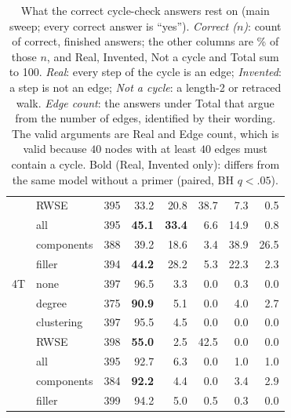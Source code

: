 \begin{table}[!t]
\begin{tabular}{@{}llrrrrrr@{}}
 & RWSE & 395 & 33.2 & 20.8 & 38.7 & 7.3 & 0.5\\ %
 & all & 395 & \textbf{45.1} & \textbf{33.4} & 6.6 & 14.9 & 0.8\\ %
 & components & 388 & 39.2 & 18.6 & 3.4 & 38.9 & 26.5\\ %
 & filler & 394 & \textbf{44.2} & 28.2 & 5.3 & 22.3 & 2.3\\ %
\addlinespace[2pt]
4T & none & 397 & 96.5 & 3.3 & 0.0 & 0.3 & 0.0\\ %
 & degree & 375 & \textbf{90.9} & 5.1 & 0.0 & 4.0 & 2.7\\ %
 & clustering & 397 & 95.5 & 4.5 & 0.0 & 0.0 & 0.0\\ %
 & RWSE & 398 & \textbf{55.0} & 2.5 & 42.5 & 0.0 & 0.0\\ %
 & all & 395 & 92.7 & 6.3 & 0.0 & 1.0 & 1.0\\ %
 & components & 384 & \textbf{92.2} & 4.4 & 0.0 & 3.4 & 2.9\\ %
 & filler & 399 & 94.2 & 5.0 & 0.5 & 0.3 & 0.0\\ %
\bottomrule
\end{tabular}
\caption{What the correct cycle-check answers rest on (main sweep; every correct answer is ``yes''). \emph{Correct ($n$)}: count of correct, finished answers; the other columns are \% of those $n$, and Real, Invented, Not a cycle and Total sum to 100. \emph{Real}: every step of the cycle is an edge; \emph{Invented}: a step is not an edge; \emph{Not a cycle}: a length-2 or retraced walk. \emph{Edge count}: the answers under Total that argue from the number of edges, identified by their wording. The valid arguments are Real and Edge count, which is valid because $40$ nodes with at least $40$ edges must contain a cycle. Bold (Real, Invented only): differs from the same model without a primer (paired, BH $q<.05$).} %
\label{tab:cycles}
\end{table}
